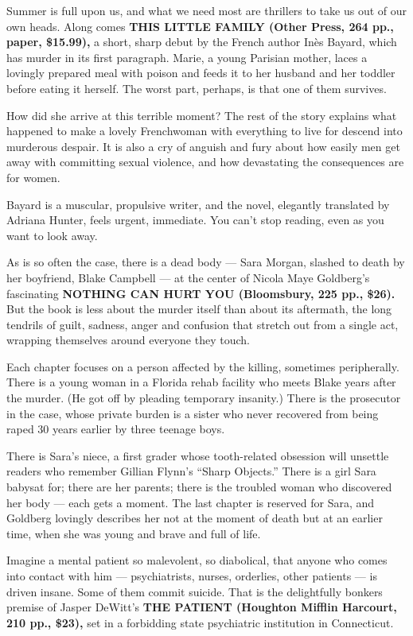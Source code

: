 Summer is full upon us, and what we need most are thrillers to take us
out of our own heads. Along comes \textbf{THIS LITTLE FAMILY (Other
Press, 264 pp., paper, \$15.99),} a short, sharp debut by the French
author Inès Bayard, which has murder in its first paragraph. Marie, a
young Parisian mother, laces a lovingly prepared meal with poison and
feeds it to her husband and her toddler before eating it herself. The
worst part, perhaps, is that one of them survives.

How did she arrive at this terrible moment? The rest of the story
explains what happened to make a lovely Frenchwoman with everything to
live for descend into murderous despair. It is also a cry of anguish and
fury about how easily men get away with committing sexual violence, and
how devastating the consequences are for women.

Bayard is a muscular, propulsive writer, and the novel, elegantly
translated by Adriana Hunter, feels urgent, immediate. You can't stop
reading, even as you want to look away.

As is so often the case, there is a dead body --- Sara Morgan, slashed
to death by her boyfriend, Blake Campbell --- at the center of Nicola
Maye Goldberg's fascinating \textbf{NOTHING CAN HURT YOU (Bloomsbury,
225 pp., \$26).} But the book is less about the murder itself than about
its aftermath, the long tendrils of guilt, sadness, anger and confusion
that stretch out from a single act, wrapping themselves around everyone
they touch.

Each chapter focuses on a person affected by the killing, sometimes
peripherally. There is a young woman in a Florida rehab facility who
meets Blake years after the murder. (He got off by pleading temporary
insanity.) There is the prosecutor in the case, whose private burden is
a sister who never recovered from being raped 30 years earlier by three
teenage boys.

There is Sara's niece, a first grader whose tooth-related obsession will
unsettle readers who remember Gillian Flynn's ``Sharp Objects.'' There
is a girl Sara babysat for; there are her parents; there is the troubled
woman who discovered her body --- each gets a moment. The last chapter
is reserved for Sara, and Goldberg lovingly describes her not at the
moment of death but at an earlier time, when she was young and brave and
full of life.

Imagine a mental patient so malevolent, so diabolical, that anyone who
comes into contact with him --- psychiatrists, nurses, orderlies, other
patients --- is driven insane. Some of them commit suicide. That is the
delightfully bonkers premise of Jasper DeWitt's \textbf{THE PATIENT
(Houghton Mifflin Harcourt, 210 pp., \$23),} set in a forbidding state
psychiatric institution in Connecticut.

